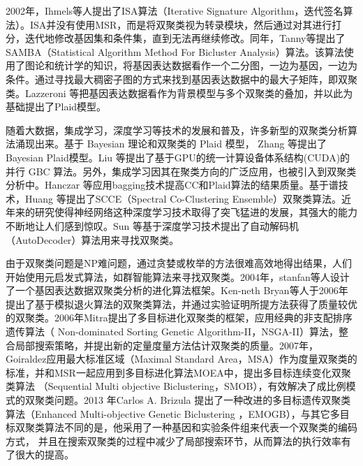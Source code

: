    2002年，Ihmels等人提出了ISA算法（Iterative Signature Algorithm，迭代签名算法）。ISA并没有使用MSR，而是将双聚类视为转录模块，然后通过对其进行打分，迭代地修改基因集和条件集，直到无法再继续修改。同年，Tanny等提出了SAMBA（Statistical Algorithm Method For Bicluster Analysis）算法。该算法使用了图论和统计学的知识，将基因表达数据看作一个二分图，一边为基因，一边为条件。通过寻找最大稠密子图的方式来找到基因表达数据中的最大子矩阵，即双聚类。Lazzeroni 等把基因表达数据看作为背景模型与多个双聚类的叠加，并以此为基础提出了Plaid模型。

    随着大数据，集成学习，深度学习等技术的发展和普及，许多新型的双聚类分析算法涌现出来。基于 Bayesian 理论和双聚类的 Plaid 模型， Zhang 等提出了 Bayesian Plaid模型。Liu 等提出了基于GPU的统一计算设备体系结构(CUDA)的并行 GBC 算法。另外，集成学习因其在聚类方向的广泛应用，也被引入到双聚类分析中。Hanczar 等应用bagging技术提高CC和Plaid算法的结果质量。基于谱技术，Huang 等提出了SCCE（Spectral Co-Clustering Ensemble）双聚类算法。近年来的研究使得神经网络这种深度学习技术取得了突飞猛进的发展，其强大的能力不断地让人们感到惊叹。Sun 等基于深度学习技术提出了自动解码机（AutoDecoder）算法用来寻找双聚类。

    由于双聚类问题是NP难问题，通过贪婪或枚举的方法很难高效地得出结果，人们开始使用元启发式算法，如群智能算法来寻找双聚类。2004年，stanfan等人设计了一个基因表达数据双聚类分析的进化算法框架。Ken-neth Bryan等人于2006年提出了基于模拟退火算法的双聚类算法，并通过实验证明所提方法获得了质量较优的双聚类。2006年Mitra提出了多目标进化双聚类的框架，应用经典的非支配排序遗传算法（ Non-dominated Sorting Genetic Algorithm-II，NSGA-II）算法，整合局部搜索策略，并提出新的定量度量方法估计双聚类的质量。2007年，Goiraldez应用最大标准区域（Maximal Standard Area，MSA）作为度量双聚类的标准，并和MSR一起应用到多目标进化算法MOEA中，提出多目标连续变化双聚类算法 （Sequential Multi objective Biclustering，SMOB），有效解决了成比例模式的双聚类问题。2013 年Carlos A. Brizula 提出了一种改进的多目标遗传双聚类算法（Enhanced Multi-objective Genetic Biclustering ，EMOGB），与其它多目标双聚类算法不同的是，他采用了一种基因和实验条件组来代表一个双聚类的编码方式， 并且在搜索双聚类的过程中减少了局部搜索环节，从而算法的执行效率有了很大的提高。
    


